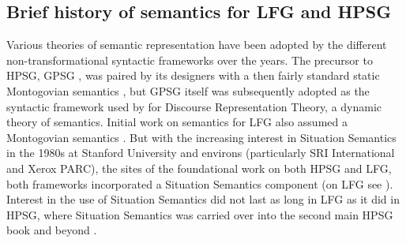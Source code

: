\subsection{Brief history of semantics for LFG and HPSG}
\label{sec:background}

Various theories of semantic representation have been adopted by the different non-transformational syntactic frameworks over the years.  
The precursor to HPSG, GPSG \citep{GKPS85a}, was paired by its designers with a then fairly standard static Montogovian semantics \citep{Montague73a-u}, but GPSG itself was subsequently adopted as the syntactic framework used by \citet[9]{kamp;reyle93} for Discourse Representation Theory, a dynamic theory of semantics.  Initial work on semantics for LFG also assumed a Montogovian semantics \citep{halvorsen83,halvorsen;kaplan88}.  But with the increasing interest in Situation Semantics \citep{barwise;perry83} in the 1980s at Stanford University and environs (particularly SRI International and Xerox PARC), the sites of the foundational work on both HPSG and LFG, both frameworks 
incorporated a Situation Semantics component (on LFG see  \citealt{fenstad;ea87}).  
Interest in the use of Situation Semantics did not last as long in LFG as it did in HPSG, 
where Situation Semantics was
carried over into the second main HPSG book \citep{ps2} and beyond \citep{ginzburg;sag00}.

